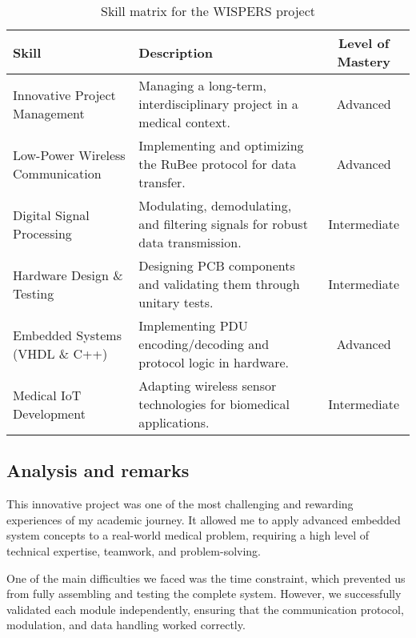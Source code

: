 \begin{table}[H]
    \centering
    \renewcommand{\arraystretch}{1.5} %
    \begin{tabular}{|p{3.5cm}|p{8cm}|c|}
    \hline
    \rowcolor[gray]{0.8}
    \textbf{Skill} & \textbf{Description} & \textbf{Level of Mastery} \\
    \hline
    Innovative Project Management & Managing a long-term, interdisciplinary project in a medical context. & Advanced \\
    \hline
    Low-Power Wireless Communication & Implementing and optimizing the RuBee protocol for data transfer. & Advanced \\
    \hline
    Digital Signal Processing & Modulating, demodulating, and filtering signals for robust data transmission. & Intermediate \\
    \hline
    Hardware Design \& Testing & Designing PCB components and validating them through unitary tests. & Intermediate \\
    \hline
    Embedded Systems (VHDL \& C++) & Implementing PDU encoding/decoding and protocol logic in hardware. & Advanced \\
    \hline
    Medical IoT Development & Adapting wireless sensor technologies for biomedical applications. & Intermediate \\
    \hline
    \end{tabular}
    \caption{Skill matrix for the WISPERS project}
    \label{tab:skill_matrix}
\end{table}

\subsection{Analysis and remarks}
\indent \indent This innovative project was one of the most challenging and rewarding experiences of my academic journey. It allowed me to apply advanced embedded system concepts to a real-world medical problem, requiring a high level of technical expertise, teamwork, and problem-solving.

\noindent One of the main difficulties we faced was the time constraint, which prevented us from fully assembling and testing the complete system. However, we successfully validated each module independently, ensuring that the communication protocol, modulation, and data handling worked correctly.
\vspace{0.25cm}

